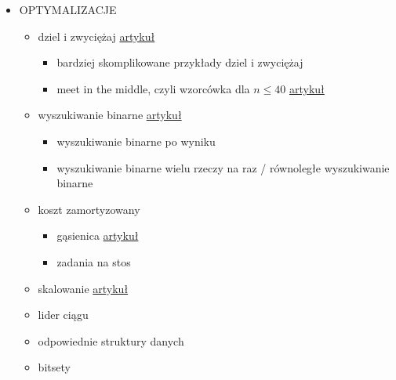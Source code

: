 \documentclass[15pt]{article}
\begin{document}
\begin{itemize}
    \item OPTYMALIZACJE
    \begin{itemize}
        \item dziel i zwyciężaj \href{http://kompendium.meetit.pl/kurs#meth1}{artykuł}
        \begin{itemize}
            \item bardziej skomplikowane przykłady dziel i zwyciężaj
            \item meet in the middle, czyli wzorcówka dla $n \leq 40$ \href{http://kompendium.meetit.pl/kurs#dp4}{artykuł}
        \end{itemize}
        \item wyszukiwanie binarne \href{http://kompendium.meetit.pl/kurs#basic2}{artykuł}
        \begin{itemize}
            \item wyszukiwanie binarne po wyniku
            \item wyszukiwanie binarne wielu rzeczy na raz / równoległe wyszukiwanie binarne
        \end{itemize}
        \item koszt zamortyzowany
        \begin{itemize}
            \item gąsienica \href{http://kompendium.meetit.pl/kurs#basic3}{artykuł}
            \item zadania na stos
        \end{itemize}
        \item skalowanie \href{http://kompendium.meetit.pl/kurs#basic6}{artykuł}
        \item lider ciągu
        \item odpowiednie struktury danych
        \item bitsety
    \end{itemize}
    

\end{itemize}
\end{document}
